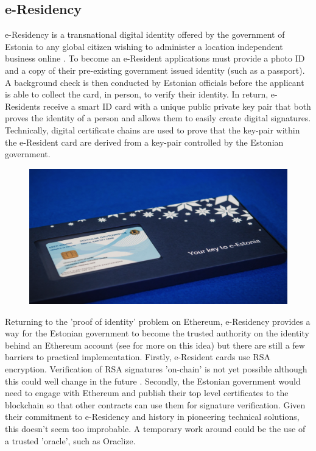 \subsection{e-Residency}
e-Residency is a transnational digital identity offered by the government of Estonia to any global citizen wishing to administer a location independent business online \cite{e-Residency}. To become an e-Resident applications must provide a photo ID and a copy of their pre-existing government issued identity (such as a passport). A background check is then conducted by Estonian officials before the applicant is able to collect the card, in person, to verify their identity. In return, e-Residents receive a smart ID card with a unique public private key pair that both proves the identity of a person and allows them to easily create digital signatures. Technically, digital certificate chains are used to prove that the key-pair within the e-Resident card are derived from a key-pair controlled by the Estonian government. \\

\begin{figure}
\centering
\includegraphics[width=\textwidth]{Figures/e-Residency}
\decoRule
\caption[]{}
\label{fig:e-Residency}
\end{figure}

Returning to the 'proof of identity' problem on Ethereum, e-Residency provides a way for the Estonian government to become the trusted authority on the identity behind an Ethereum account (see \cite{IDBereg} \cite{BertaniKYC} for more on this idea) but there are still a few barriers to practical implementation. Firstly, e-Resident cards use RSA encryption. Verification of RSA signatures 'on-chain' is not yet possible although this could well change in the future \cite{RSARequest}. Secondly, the Estonian government would need to engage with Ethereum and publish their top level certificates to the blockchain so that other contracts can use them for signature verification. Given their commitment to e-Residency and history in pioneering technical solutions\cite{EstoniaE-Voting}, this doesn't seem too improbable. A temporary work around could be the use of a trusted 'oracle'\cite{BertaniOracles}, such as Oraclize\cite{Oraclise}.

